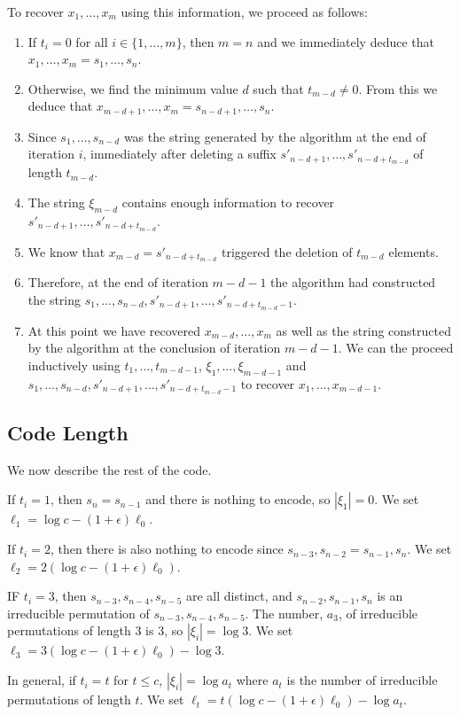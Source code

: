 \documentclass{patmorin}
\begin{document}
To recover $x_1,\ldots,x_m$ using this information, we proceed as follows:
\begin{enumerate}
  \item If $t_i=0$ for all $i\in\{1,\ldots,m\}$, then $m=n$ and we immediately deduce that $x_1,\ldots,x_m=s_1,\ldots,s_n$.
  \item Otherwise, we find the minimum value $d$ such that $t_{m-d}\neq 0$.  
  From this we deduce that $x_{m-d+1},\ldots,x_m = s_{n-d+1},\ldots,s_n$.
  \item Since $s_1,\ldots,s_{n-d}$ was the string generated by the algorithm at the end of iteration $i$, immediately after deleting a suffix $s'_{n-d+1},\ldots,s'_{n-d+t_{m-d}}$ of length $t_{m-d}$.
  \item The string $\xi_{m-d}$ contains enough information to recover
  $s'_{n-d+1},\ldots,s'_{n-d+t_{m-d}}$.
  \item We know that $x_{m-d} = s'_{n-d+t_{m-d}}$ triggered the deletion of $t_{m-d}$ elements.
  \item Therefore, at the end of iteration $m-d-1$ the algorithm had constructed the string $s_1,\ldots,s_{n-d},s'_{n-d+1},\ldots,s'_{n-d+t_{m-d}-1}$.
  \item At this point we have recovered $x_{m-d},\ldots,x_m$ as well as the string constructed by the algorithm at the conclusion of iteration $m-d-1$.  We can the proceed inductively using $t_1,\ldots,t_{m-d-1}$, $\xi_1,\ldots,\xi_{m-d-1}$ and $s_1,\ldots,s_{n-d},s'_{n-d+1},\ldots,s'_{n-d+t_{m-d}-1}$ to recover $x_1,\ldots,x_{m-d-1}$.
\end{enumerate}

\subsection{Code Length}

We now describe the rest of the code.

If $t_i=1$, then $s_n=s_{n-1}$ and there is nothing to encode, so $|\xi_1|=0$.  We set $\ell_1=\log c - (1+\epsilon)\ell_0$.

If $t_i=2$, then there is also nothing to encode since $s_{n-3},s_{n-2}=s_{n-1},s_n$. We set $\ell_2=2(\log c - (1+\epsilon)\ell_0)$.

IF $t_i=3$, then $s_{n-3},s_{n-4},s_{n-5}$ are all distinct, and $s_{n-2},s_{n-1},s_n$ is an irreducible permutation of $s_{n-3},s_{n-4},s_{n-5}$.  The number, $a_3$, of irreducible permutations of length 3 is 3, so $|\xi_i|=\log 3$.  We set $\ell_3 = 3(\log c-(1+\epsilon)\ell_0)-\log 3$.

In general, if $t_i=t$ for $t\le c$, $|\xi_i|=\log a_t$ where $a_t$ is the number of irreducible permutations of length $t$. We set $\ell_t = t(\log c - (1+\epsilon)\ell_0) - \log a_t$.
\end{document}
